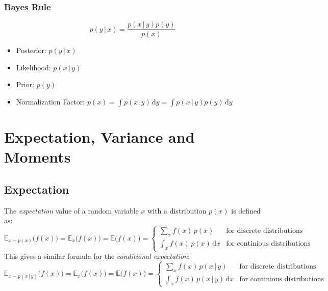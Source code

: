 \documentclass[a4paper, 11pt, accentcolor = tud3b]{tudreport}
\newcommand{\E}{\ensuremath{\mathbb{E}}}
\newcommand{\given}{\ensuremath{\,\vert\,}}
\newcommand{\dif}[1]{\ensuremath{\,\mathrm{d}#1}}
\begin{document}
			\subsubsection{Bayes Rule}
				\begin{equation}
					p(y \given x) = \frac{p(x \given y) p(y)}{p(x)}
				\end{equation}

				\begin{itemize}
					\item Posterior: \tabto{4cm} \( p(y \given x) \)
					\item Likelihood: \tabto{4cm} \( p(x \given y) \)
					\item Prior: \tabto{4cm} \( p(y) \)
					\item Normalization Factor: \tabto{4cm} \( p(x) = \int p(x, y) \dif{y} = \int p(x \given y) p(y) \dif{y} \)
				\end{itemize}

		\section{Expectation, Variance and Moments}
			\subsection{Expectation}
				The \emph{expectation} value of a random variable \(x\) with a distribution \(p(x)\) is defined as:
				\begin{equation}
					\E_{x \sim p(x)}\big(f(x)\big) = \E_x\big(f(x)\big) = \E\big(f(x)\big) =
						\begin{cases}
							\sum_x f(x) \, p(x) & \textrm{for discrete distributions} \\
							\int_x f(x) \, p(x) \dif{x} & \textrm{for continious distributions}
						\end{cases}
				\end{equation}
				This gives a similar formula for the \emph{conditional expectation}:
				\begin{equation}
					\E_{x \sim p(x \given y)}\big(f(x)\big) = \E_x\big(f(x)\big) = \E\big(f(x)\big) =
						\begin{cases}
							\sum_x f(x) \, p(x \given y) & \textrm{for discrete distributions} \\
							\int_x f(x) \, p(x \given y) \dif{x} & \textrm{for continious distributions}
						\end{cases}
				\end{equation}
\end{document}
